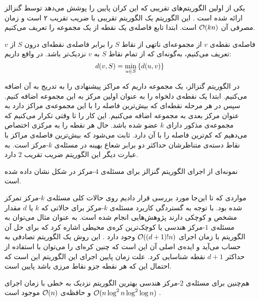 یکی از اولین الگوریتم‌های تقریبی که این کران پایین را پوشش می‌دهد توسط گنزالز ارائه شده است . این الگوریتم یک الگوریتم تقریبی با ضریب تقریب ۲ است و زمان مصرفی آن $\mathcal{O}(kn)$ است. ابتدا تابع فاصله‌ی یک نقطه از یک مجموعه را تعریف می‌کنیم.

فاصله‌ی نقطه‌ی $v$ از مجموعه‌ای ناتهی از نقاط $S$ را برابر فاصله‌ی نقطه‌ای درون $S$ از $v$ تعریف می‌کنیم، به‌گونه‌ای که از تمام نقاط $S$ به $v$ نزدیک‌تر باشد. در واقع داریم:
$$d(v, S) = \min_{u \in S} \left\{  d(u, v)  \right\}$$

در الگوریتم گنزالز، یک مجموعه داریم که مراکز پیشنهادی را به تدریج به آن اضافه می‌کنیم. ابتدا یک نقطه‌ی دلخواه را به عنوان اولین مرکز به این مجموعه اضافه کنیم. سپس در هر مرحله نقطه‌ای که بیش‌ترین فاصله را با این مجموعه‌ی مراکز دارد به عنوان مرکز بعدی به مجموعه اضافه می‌کنیم. این کار را تا وقتی تکرار می‌کنیم که مجموعه‌ی مذکور دارای $k$ عضو شده باشد. حال هر نقطه را به مرکزی اختصاص می‌دهیم که کم‌ترین فاصله را با آن دارد. ثابت می‌شود که بیش‌ترین فاصله‌ی مراکز با نقاط دسته‌ی متناظرشان حداکثر دو برابر شعاع بهینه در مسئله‌ی $k$-مرکز است. به عبارت دیگر این الگوریتم ضریب تقریب $2$ دارد.

نمونه‌ای از اجرای الگوریتم گنزالز برای مسئله‌ی $4$-مرکز در شکل  نشان داده شده است.


مواردی که تا این‌جا مورد بررسی قرار دادیم روی حالات کلی مسئله‌ی $k$-مرکز تمرکز شده بود. با توجه به گستردگی کاربرد مسئله‌ی $k$-مرکز برای حالاتی که $k$ یا $d$ مقدار مشخص و کوچکی دارند پژوهش‌هایی انجام شده است.
به عنوان مثال می‌توان به مسئله‌ی $1$-مرکز هندسی یا کوچک‌ترین کره‌ی محیطی اشاره کرد که برای حل آن الگوریتم با زمان اجرای  $\mathcal{O}((d+1)! n)$ وجود دارد . این روش یک الگوریتم تصادفی به حساب می‌آید و ایده‌ی اصلی آن این است که چنین کره‌ای را می‌توان با استفاده از حداکثر $d+1$ نقطه شناسایی کرد. علت زمان پایین اجرای این الگوریتم این است که احتمال این که هر نقطه جزو نقاط مرزی باشد پایین است.

هم‌چنین برای مسئله‌ی $2$-مرکز هندسی بهترین الگوریتم نزدیک به خطی با زمان اجرای $\mathcal{O}(n \log^2{n} \log^2{\log{n}})$ و حافظه‌ی $\mathcal{O}(n)$ موجود است .


